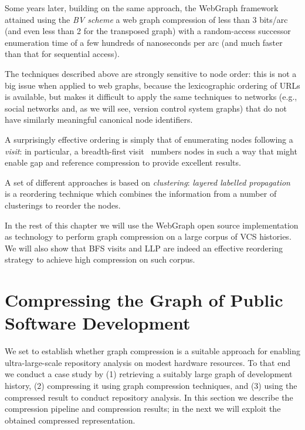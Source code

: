Some years later, building on the same approach, the WebGraph
framework~\cite{BoVWFI} attained using the \emph{BV scheme} a web graph
compression of less than 3 bits/arc (and even less than 2 for the transposed
graph) with a random-access successor enumeration time of a few hundreds of
nanoseconds per arc (and much faster than that for sequential access).

The techniques described above are strongly sensitive to node order: this is
not a big issue when applied to web graphs, because the lexicographic ordering
of URLs is available, but makes it difficult to apply the same techniques to
networks (e.g., social networks and, as we will see, version control system
graphs) that do not have similarly meaningful canonical node identifiers.

A surprisingly effective ordering is simply that of enumerating nodes following
a \emph{visit}: in particular, a breadth-first visit~\cite{ApDGCB} numbers
nodes in such a way that might enable gap and reference compression to provide
excellent results.

A set of different approaches is based on \emph{clustering}: \emph{layered
  labelled propagation}~\cite{BRSLLP} is a reordering technique which combines
the information from a number of clusterings to reorder the nodes.

In the rest of this chapter we will use the WebGraph open source implementation
as technology to perform graph compression on a large corpus of VCS histories.
We will also show that \gls{BFS} visits and \gls{LLP} are indeed an effective
reordering strategy to achieve high compression on such corpus.

\section{Compressing the Graph of Public Software Development}%
\label{sec:compression-comp}

We set to establish whether graph compression is a suitable approach for
enabling ultra-large-scale repository analysis on modest hardware resources.
To that end we conduct a case study by (1) retrieving a suitably large
graph of development history, (2) compressing it using graph compression
techniques, and (3) using the compressed result to conduct repository analysis.
In this section we describe the compression pipeline and compression results;
in the next we will exploit the obtained compressed representation.

